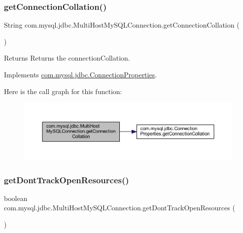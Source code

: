 \subsubsection{\texorpdfstring{get\+Connection\+Collation()}{getConnectionCollation()}}
{\footnotesize\ttfamily String com.\+mysql.\+jdbc.\+Multi\+Host\+My\+S\+Q\+L\+Connection.\+get\+Connection\+Collation (\begin{DoxyParamCaption}{ }\end{DoxyParamCaption})}

\begin{DoxyReturn}{Returns}
Returns the connection\+Collation. 
\end{DoxyReturn}


Implements \mbox{\hyperlink{interfacecom_1_1mysql_1_1jdbc_1_1_connection_properties_ad1204db6592b3e0cfa702d4f6abed586}{com.\+mysql.\+jdbc.\+Connection\+Properties}}.

Here is the call graph for this function\+:
\nopagebreak
\begin{figure}[H]
\begin{center}
\leavevmode
\includegraphics[width=350pt]{classcom_1_1mysql_1_1jdbc_1_1_multi_host_my_s_q_l_connection_a3cde7bb1197d4ba1f7ed76e515d30d8d_cgraph}
\end{center}
\end{figure}
\mbox{\label{classcom_1_1mysql_1_1jdbc_1_1_multi_host_my_s_q_l_connection_a19be4784393f9abfc6ae0cf6a404af0a}} 
\subsubsection{\texorpdfstring{get\+Dont\+Track\+Open\+Resources()}{getDontTrackOpenResources()}}
{\footnotesize\ttfamily boolean com.\+mysql.\+jdbc.\+Multi\+Host\+My\+S\+Q\+L\+Connection.\+get\+Dont\+Track\+Open\+Resources (\begin{DoxyParamCaption}{ }\end{DoxyParamCaption})}

